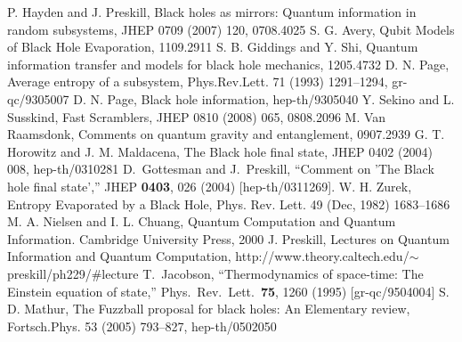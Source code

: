 \documentclass[12pt]{article}%
\begin{document}
\begin{thebibliography}{99}
 P. Hayden and J. Preskill, Black holes as mirrors: Quantum information in random subsystems, JHEP 0709 (2007) 120, 0708.4025
        S. G. Avery, Qubit Models of Black Hole Evaporation, 1109.2911
 S. B. Giddings and Y. Shi, Quantum information transfer and models for black hole mechanics, 1205.4732
        D. N. Page, Average entropy of a subsystem, Phys.Rev.Lett. 71 (1993) 1291--1294, gr-qc/9305007
  D. N. Page, Black hole information, hep-th/9305040
 Y. Sekino and L. Susskind, Fast Scramblers, JHEP 0810 (2008) 065, 0808.2096
  M. Van Raamsdonk, Comments on quantum gravity and entanglement, 0907.2939
 G. T. Horowitz and J. M. Maldacena, The Black hole final state, JHEP 0402 (2004) 008, hep-th/0310281
   D.~Gottesman and J.~Preskill, ``Comment on 'The Black hole final state',''  JHEP {\bf 0403}, 026 (2004)  [hep-th/0311269].
 W. H. Zurek, Entropy Evaporated by a Black Hole, Phys. Rev. Lett. 49 (Dec, 1982) 1683--1686
    M. A. Nielsen and I. L. Chuang, Quantum Computation and Quantum Information. Cambridge University Press, 2000
 J. Preskill, Lectures on Quantum Information and Quantum Computation, http://www.theory.caltech.edu/$\sim$preskill/ph229/$\#$lecture
  T.~Jacobson, ``Thermodynamics of space-time: The Einstein equation of state,''
  Phys.\ Rev.\ Lett.\  {\bf 75}, 1260 (1995) [gr-qc/9504004]  
        S. D. Mathur, The Fuzzball proposal for black holes: An Elementary review, Fortsch.Phys. 53 (2005) 793--827, hep-th/0502050


\end{thebibliography}


\end{document}
